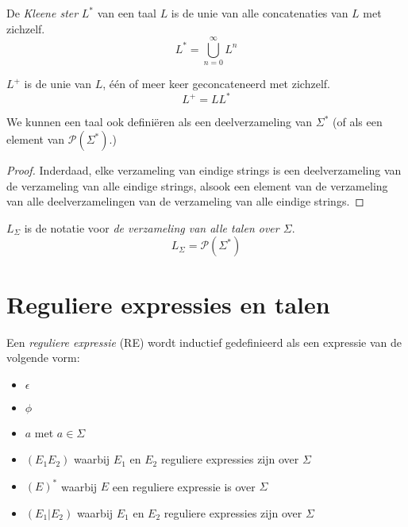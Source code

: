\documentclass[main.tex]{subfiles}
\begin{document}
\begin{de}
  De \emph{Kleene ster} $L^*$ van een taal $L$ is de unie van alle concatenaties van $L$ met zichzelf.
  \[
  L^* = \bigcup_{n=0}^{\infty}L^n
  \]
\end{de}

\begin{de}
  $L^{+}$ is de unie van $L$, \'e\'en of meer keer geconcateneerd met zichzelf.
  \[
  L^{+} = LL^{*}
  \]
\end{de}

\begin{ei}
  We kunnen een taal ook defini\"eren als een deelverzameling van $\Sigma^{*}$ (of als een element van $\mathcal{P}(\Sigma^{*})$.)
  \begin{proof}
    Inderdaad, elke verzameling van eindige strings is een deelverzameling van de verzameling van alle eindige strings, alsook een element van de verzameling van alle deelverzamelingen van de verzameling van alle eindige strings.
  \end{proof}
\end{ei}

\begin{de}
  $L_{\Sigma}$ is de notatie voor \emph{de verzameling van alle talen over $\Sigma$}. 
  \[ L_{\Sigma} = \mathcal{P}(\Sigma^{*}) \]
\end{de}

\section{Reguliere expressies en talen}
\label{sec:reguliere-expressies-en-talen}

\begin{de}
  Een \emph{reguliere expressie} (RE) wordt inductief gedefinieerd als een expressie van de volgende vorm:
  \begin{itemize}
  \item $\epsilon$
  \item $\phi$
  \item $a$ met $a \in \Sigma$
  \item $(E_1E_2)$ waarbij $E_1$ en $E_2$ reguliere expressies zijn over $\Sigma$
  \item $(E)^*$ waarbij $E$ een reguliere expressie is over $\Sigma$
  \item $(E_1|E_2)$ waarbij $E_1$ en $E_2$ reguliere expressies zijn over $\Sigma$
  \end{itemize}
\end{de}
\end{document}
